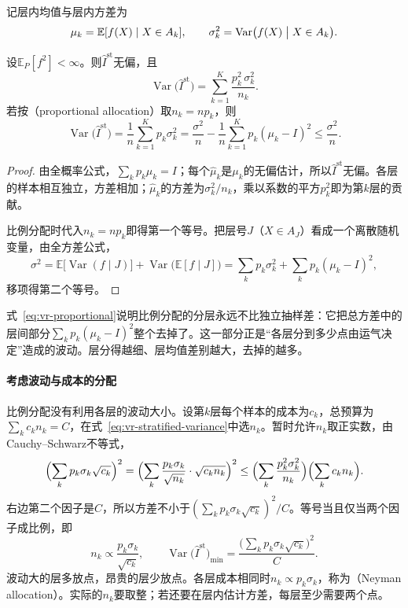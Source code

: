 记层内均值与层内方差为
\[
 \mu_k=\mathbb{E}[f(X)\mid X\in A_k],\qquad \sigma_k^2=\operatorname{Var}\bigl(f(X)\bigm|X\in A_k\bigr) .
\]

\begin{theorem}[分层估计的方差]
\label{thm:vr-stratified}
设$\mathbb{E}_P[f^2]<\infty$。则$\hat{I}^{\mathrm{st}}$无偏，且
\begin{equation}
 \operatorname{Var}\bigl(\hat{I}^{\mathrm{st}}\bigr)=\sum_{k=1}^{K}\frac{p_k^2\,\sigma_k^2}{n_k} .
 \label{eq:vr-stratified-variance}
\end{equation}
若按（proportional allocation）取$n_k=np_k$，则
\begin{equation}
 \operatorname{Var}\bigl(\hat{I}^{\mathrm{st}}\bigr)=\frac1n\sum_{k=1}^{K}p_k\sigma_k^2=\frac{\sigma^2}{n}-\frac1n\sum_{k=1}^{K}p_k(\mu_k-I)^2\leq\frac{\sigma^2}{n} .
 \label{eq:vr-proportional}
\end{equation}
\end{theorem}

\begin{proof}
由全概率公式，$\sum_kp_k\mu_k=I$；每个$\hat{\mu}_k$是$\mu_k$的无偏估计，所以$\hat{I}^{\mathrm{st}}$无偏。各层的样本相互独立，方差相加；$\hat{\mu}_k$的方差为$\sigma_k^2/n_k$，乘以系数的平方$p_k^2$即为第$k$层的贡献。

比例分配时代入$n_k=np_k$即得第一个等号。把层号$J$（$X\in A_J$）看成一个离散随机变量，由全方差公式，
\[
 \sigma^2=\mathbb{E}\bigl[\operatorname{Var}(f\mid J)\bigr]+\operatorname{Var}\bigl(\mathbb{E}[f\mid J]\bigr)=\sum_kp_k\sigma_k^2+\sum_kp_k(\mu_k-I)^2 ,
\]
移项得第二个等号。
\end{proof}

式~\eqref{eq:vr-proportional}说明比例分配的分层永远不比独立抽样差：它把总方差中的层间部分$\sum_kp_k(\mu_k-I)^2$整个去掉了。这一部分正是“各层分到多少点由运气决定”造成的波动。层分得越细、层均值差别越大，去掉的越多。

\paragraph{考虑波动与成本的分配}
比例分配没有利用各层的波动大小。设第$k$层每个样本的成本为$c_k$，总预算为$\sum_kc_kn_k=C$，在式~\eqref{eq:vr-stratified-variance}中选$n_k$。暂时允许$n_k$取正实数，由Cauchy--Schwarz不等式，
\[
 \Bigl(\sum_kp_k\sigma_k\sqrt{c_k}\Bigr)^2=\Bigl(\sum_k\frac{p_k\sigma_k}{\sqrt{n_k}}\cdot\sqrt{c_kn_k}\Bigr)^2\leq\Bigl(\sum_k\frac{p_k^2\sigma_k^2}{n_k}\Bigr)\Bigl(\sum_kc_kn_k\Bigr) .
\]
右边第二个因子是$C$，所以方差不小于$(\sum_kp_k\sigma_k\sqrt{c_k})^2/C$。等号当且仅当两个因子成比例，即
\begin{equation}
 n_k\propto\frac{p_k\sigma_k}{\sqrt{c_k}},\qquad \operatorname{Var}\bigl(\hat{I}^{\mathrm{st}}\bigr)_{\min}=\frac{\bigl(\sum_kp_k\sigma_k\sqrt{c_k}\bigr)^2}{C} .
 \label{eq:vr-neyman}
\end{equation}
波动大的层多放点，昂贵的层少放点。各层成本相同时$n_k\propto p_k\sigma_k$，称为（Neyman allocation）。实际的$n_k$要取整；若还要在层内估计方差，每层至少需要两个点。

